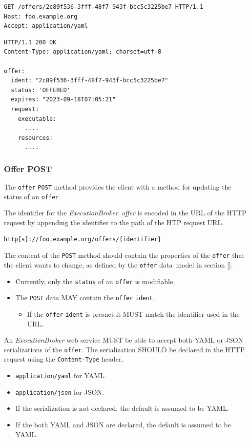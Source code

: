 \documentclass[11pt,a4paper]{ivoa}
\newcommand{\json} {JSON}
\newcommand{\yaml} {YAML}
\newcommand{\datamodel} {data~model}
\newcommand{\webservice} {web service}
\newcommand{\execbrokerclass} {\textit{ExecutionBroker}}
\newcommand{\execoffer}[1] {\textit{ExecutionBroker~offer#1}}
\newcommand{\codeword}[1] {\texttt{#1}}
\begin{document}
\begin{lstlisting}[]
GET /offers/2c89f536-3fff-48f7-943f-bcc5c3225be7 HTTP/1.1
Host: foo.example.org
Accept: application/yaml
\end{lstlisting}

\begin{lstlisting}[]
HTTP/1.1 200 OK
Content-Type: application/yaml; charset=utf-8

offer:
  ident: "2c89f536-3fff-48f7-943f-bcc5c3225be7"
  status: 'OFFERED'
  expires: "2023-09-18T07:05:21"
  request:
    executable:
      ....
    resources:
      ....
\end{lstlisting}

\subsubsection{Offer POST}
\label{subsub-execution-planner-offer-post}

The \codeword{offer} \codeword{POST} method provides the client with a method for
updating the status of an \codeword{offer}.

The identifier for the \execoffer{} is encoded in the URL of the HTTP request by appending the
identifier to the path of the HTP request URL.

\begin{lstlisting}[]
http[s]://foo.example.org/offers/{identifier}
\end{lstlisting}

The content of the \codeword{POST} method should contain the properties
of the \codeword{offer} that the client wants to change, as defined by
the \codeword{offer} \datamodel{} in section \ref{}.
\begin{itemize}
    \item Currently, only the \codeword{status} of an \codeword{offer} is modifiable.
    \item The \codeword{POST} data MAY contain the \codeword{offer} \codeword{ident}.
    \begin{itemize}
        \item If the \codeword{offer} \codeword{ident} is presnet it MUST match the identifier used in the URL.
    \end{itemize}
\end{itemize}

An \execbrokerclass{} \webservice{} MUST be able to accept both \yaml{} or \json{} serializations
of the \codeword{offer}.
The serialization SHOULD be declared in the HTTP request using the \codeword{Content-Type} header.
\begin{itemize}
    \item \codeword{application/yaml} for \yaml{}.
    \item \codeword{application/json} for \json{}.
    \item If the serialization is not declared, the default is assumed to be \yaml{}.
    \item If the both \yaml{} and \json{} are declared, the default is assumed to be \yaml{}.
\end{itemize}
\end{document}
